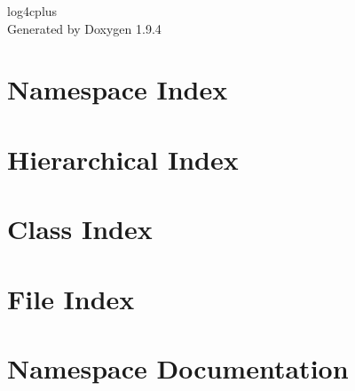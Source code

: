 \documentclass[twoside]{book}
\newcommand{\+}{\discretionary{\mbox{\scriptsize$\hookleftarrow$}}{}{}}
\newcommand{\clearemptydoublepage}{%
    \newpage{\pagestyle{empty}\cleardoublepage}%
  }
\begin{document}
  \raggedbottom
    \hypersetup{pageanchor=false,
                bookmarksnumbered=true,
                pdfencoding=unicode
               }
  \begin{titlepage}
  \vspace*{7cm}
  \begin{center}%
  {\Large log4cplus}\\
  \vspace*{1cm}
  {\large Generated by Doxygen 1.9.4}\\
  \end{center}
  \end{titlepage}
  \clearemptydoublepage
  \tableofcontents
  \clearemptydoublepage
  \hypersetup{pageanchor=true}
\chapter{Namespace Index}

\chapter{Hierarchical Index}

\chapter{Class Index}

\chapter{File Index}

\chapter{Namespace Documentation}









\end{document}
